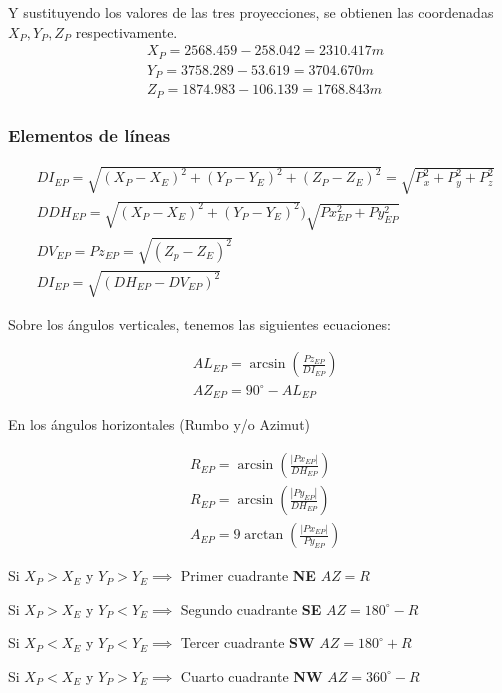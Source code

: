 Y sustituyendo los valores de las tres proyecciones, se obtienen las coordenadas $X_P,Y_P,Z_P$ respectivamente.
\begin{align*}
    &X_P=2568.459-258.042=2310.417m\\
    &Y_P=3758.289-53.619=3704.670m\\
    &Z_P=1874.983-106.139=1768.843m
\end{align*}

\subsubsection{Elementos de líneas}
\begin{align*}
    &DI_{EP}=\sqrt{\left(X_P-X_E\right)^2+\left(Y_P-Y_E\right)^2+\left(Z_P-Z_E\right)^2}=\sqrt{P_x^2+P_y^2+P_z^2}\\
    &DDH_{EP}=\sqrt{\left(X_P-X_E\right)^2+\left(Y_P-Y_E\right)^2})\sqrt{Px_{EP}^2+Py_{EP}^2}\\
    &DV_{EP}=Pz_{EP}=\sqrt{\left(Z_p-Z_E\right)^2}\\
    &DI_{EP}=\sqrt{\left(DH_{EP}-DV_{EP}\right)^2}
\end{align*}

Sobre los ángulos verticales, tenemos las siguientes ecuaciones:

\begin{align}
    &AL_{EP}=\arcsin{\left(\frac{Pz_{EP}}{DI_{EP}}\right)}\\
    &AZ_{EP}=90^{\circ}-AL_{EP}
\end{align}

En los ángulos horizontales (Rumbo y/o Azimut)

\begin{align}
    &R_{EP}=\arcsin{\left(\frac{\left\lvert Px_{EP}\right\rvert }{DH_{EP}}\right)}\\
    &R_{EP}=\arcsin{\left(\frac{\left\lvert Py_{EP}\right\rvert }{DH_{EP}}\right)}\\
    &A_{EP}=9\arctan{\left(\frac{\left\lvert Px_{EP}\right\rvert}{Py_{EP}}\right)}
\end{align}

Si $X_P>X_E$ y $Y_P>Y_E\implies$ Primer cuadrante \textbf{NE} $AZ=R$

Si $X_P>X_E$ y $Y_P<Y_E\implies$ Segundo cuadrante \textbf{SE} $AZ=180^{\circ}-R$

Si $X_P<X_E$ y $Y_P<Y_E\implies$ Tercer cuadrante \textbf{SW} $AZ=180^{\circ}+R$

Si $X_P<X_E$ y $Y_P>Y_E\implies$ Cuarto cuadrante \textbf{NW} $AZ=360^{\circ}-R$

